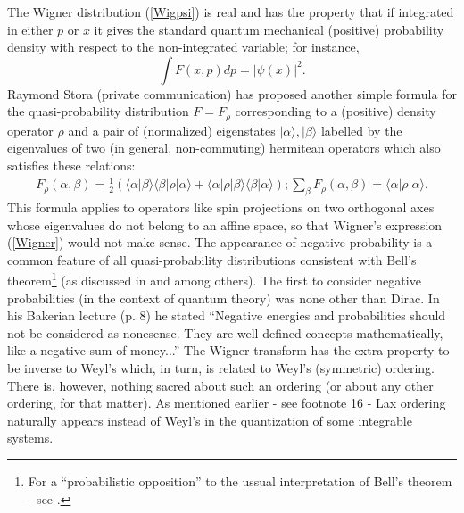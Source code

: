\documentclass[12pt]{article}
\begin{document}
{ The Wigner distribution (\ref{Wigpsi}) is real and has the property that if integrated in
either $p$ or $x$ it gives the standard quantum mechanical (positive) probability density with respect to the non-integrated variable; for instance,
\begin{equation}
\int F(x, p)dp = |\psi(x)|^2.
\end{equation}
Raymond Stora (private communication) has proposed another simple formula for the quasi-probability distribution $F = F_\rho$ corresponding to a (positive) density operator $\rho$ and a pair of (normalized) eigenstates $|\alpha\rangle, |\beta\rangle$ labelled by the eigenvalues of two (in general, non-commuting) hermitean operators which also satisfies these relations:
\begin{eqnarray}
\label{Stor}
F_\rho (\alpha, \beta) = \frac{1}{2}(\langle\alpha|\beta\rangle \langle\beta|\rho|\alpha\rangle + \langle \alpha|\rho|\beta\rangle \langle\beta|\alpha \rangle);
\sum_\beta F_\rho (\alpha, \beta) = \langle \alpha|\rho|\alpha \rangle.
\end{eqnarray}
This formula applies to operators like spin projections on two orthogonal axes whose eigenvalues do not belong to an affine space, so that Wigner's expression (\ref{Wigner}) would not make sense. The appearance of negative probability is a common feature of all quasi-probability distributions consistent with Bell's theorem\footnote{For a ``probabilistic opposition'' to the ussual interpretation of Bell's theorem - see \cite{Kh}.} (as discussed in \cite{M86} and \cite{SR} among others). The first to consider negative probabilities (in the context of quantum theory) was none other than Dirac. In his Bakerian lecture \cite{D42} (p. 8) he stated ``Negative energies and probabilities should not be considered as nonesense. They are well defined concepts mathematically, like a negative sum of money...'' The Wigner transform has the extra property to be inverse to Weyl's which, in turn, is related to Weyl's (symmetric) ordering. There is, however, nothing sacred about such an ordering (or about any other ordering, for that matter). As mentioned earlier - see footnote 16 - Lax ordering naturally appears instead of Weyl's in the quantization of some integrable systems.}
\end{document}
